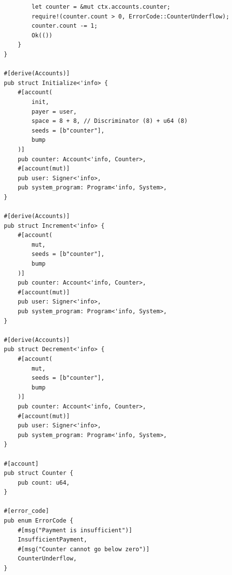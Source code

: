 \documentclass[14pt]{extreport}
\begin{document}
{\begin{lstlisting}
        let counter = &mut ctx.accounts.counter;
        require!(counter.count > 0, ErrorCode::CounterUnderflow);
        counter.count -= 1;
        Ok(())
    }
}

#[derive(Accounts)]
pub struct Initialize<'info> {
    #[account(
        init,
        payer = user,
        space = 8 + 8, // Discriminator (8) + u64 (8)
        seeds = [b"counter"],
        bump
    )]
    pub counter: Account<'info, Counter>,
    #[account(mut)]
    pub user: Signer<'info>,
    pub system_program: Program<'info, System>,
}

#[derive(Accounts)]
pub struct Increment<'info> {
    #[account(
        mut,
        seeds = [b"counter"],
        bump
    )]
    pub counter: Account<'info, Counter>,
    #[account(mut)]
    pub user: Signer<'info>,
    pub system_program: Program<'info, System>,
}

#[derive(Accounts)]
pub struct Decrement<'info> {
    #[account(
        mut,
        seeds = [b"counter"],
        bump
    )]
    pub counter: Account<'info, Counter>,
    #[account(mut)]
    pub user: Signer<'info>,
    pub system_program: Program<'info, System>,
}

#[account]
pub struct Counter {
    pub count: u64,
}

#[error_code]
pub enum ErrorCode {
    #[msg("Payment is insufficient")]
    InsufficientPayment,
    #[msg("Counter cannot go below zero")]
    CounterUnderflow,
}
\end{lstlisting}
}
\end{document}
